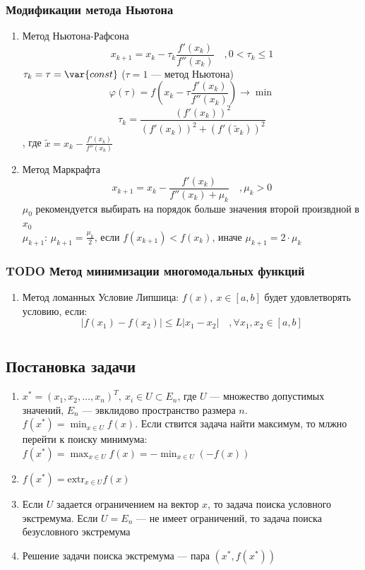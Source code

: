 \documentclass[oneside]{book}
\newcommand{\const}{\var{const}}
\theoremstyle{plain}
\theoremstyle{remark}
\theoremstyle{definition}
\begin{document}
\subsection{Модификации метода Ньютона}
\label{sec:org76485a0}
\begin{enumerate}
\item Метод Ньютона-Рафсона
\label{sec:orgad040bb}
\[ x_{k + 1} = x_k - \tau_k\frac{f'(x_k)}{f''(x_k)}\quad, 0 < \tau_k \le 1 \]
\(\tau_k = \tau = \const\) (\(\tau = 1\) --- метод Ньютона)
\[ \varphi(\tau) = f(x_k - \tau\frac{f'(x_k)}{f''(x_k)}) \to \min \]
\[ \tau_k = \frac{(f'(x_k))^2}{(f'(x_k))^2 + (f'(\tilde{x}_k))^2} \]
, где \(\tilde{x} = x_k - \frac{f'(x_k)}{f''(x_k)}\)
\item Метод Маркрафта
\label{sec:orgb61b9f8}
\[ x_{k + 1} = x_k - \frac{f'(x_k)}{f''(x_k) + \mu_k}\quad,\mu_k > 0 \]
\(\mu_0\) рекомендуется выбирать на порядок больше значения второй произвдной в \(x_0\) \\
\(\mu_{k + 1}\): \(\mu_{k + 1} = \frac{\mu_k}{2}\), если \(f(x_{k + 1}) < f(x_k)\), иначе \(\mu_{k + 1} = 2\cdot\mu_k\)
\end{enumerate}
\subsection{{\bfseries\sffamily TODO} Метод минимизации многомодальных функций}
\label{sec:org15a0176}
\begin{enumerate}
\item Метод ломанных
\label{sec:org3fc2c19}
Условие Липшица: \(f(x),\ x\in [a, b]\) будет удовлетворять условию, если:
\[ |f(x_1) - f(x_2)| \le L|x_1 - x_2|\quad,\forall x_1, x_2 \in [a, b] \]
\end{enumerate}
\chapter{}
\label{sec:orgf378ba3}
\section{Постановка задачи}
\label{sec:orgb2f2739}
\begin{enumerate}
\item \(x^* = (x_1, x_2, \dots, x_n)^T,\ x_i \in U \subset E_n\), где \(U\) --- множество допустимых значений, \(E_n\) --- эвклидово
пространство размера \(n\). \(f(x^*) = \min_{x \in U} f(x)\). Если
ствится задача найти максимум, то млжно перейти к поиску минимума: \(f(x^*) = \max_{x\in U}f(x) = -\min_{x \in U}(-f(x))\)
\item \(f(x^*) = \text{extr}_{x \in U}f(x)\)
\item Если \(U\) задается ограничением на вектор \(x\), то задача поиска
условного экстремума. Если \(U = E_n\) --- не имеет ограничений,
то задача поиска безусловного экстремума
\item Решение задачи поиска экстремума --- пара \((x^*, f(x^*))\)
\end{enumerate}
\end{document}

